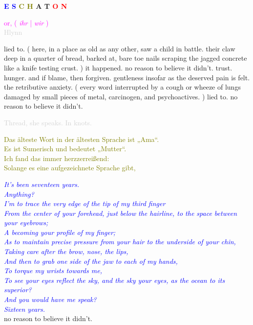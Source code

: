 \documentclass[11pt]{article}
\begin{document}
\begingroup
\begin{center}
\huge \textbf{\textcolor{blue}{E S} \textcolor{olive}{C H} A T \textcolor{red}{O N}}
\end{center}
\endgroup

\begingroup
\begin{center}
\textcolor{magenta}{or, ( \textit{ihr} | \textit{wir} )} \\ \textcolor{lightgray}{Hlynn}
\end{center}
\endgroup

\vspace*{2\baselineskip}

\begingroup
lied to. ( here, in a place as old as any other, saw a child in battle. their claw deep in a quarter of bread, barked at, bare toe nails scraping the jagged concrete like a knife testing crust. ) it happened. no reason to believe it didn't. trust. hunger. and if blame, then forgiven. gentleness insofar as the deserved pain is felt. the retributive anxiety. ( every word interrupted by a cough or wheeze of lungs damaged by small pieces of metal, carcinogen, and psychoactives. ) lied to. no reason to believe it didn't.
\endgroup

\begingroup
\begin{center}
\textcolor{lightgray}{Thread, she speaks. In knots.}
\rightskip\leftskip
\end{center}
\endgroup

\begingroup
\begin{center}
\textcolor{olive}{Das älteste Wort in der ältesten Sprache ist „Ama“. \\ Es ist Sumerisch und bedeutet „Mutter“. \\ Ich fand das immer herzzerreißend: \\ Solange es eine aufgezeichnete Sprache gibt,}
\end{center}
\endgroup

\begingroup
\begin{center}
\textit{\textcolor{blue}{It's been seventeen years. \\ Anything? \\ I'm to trace the very edge of the tip of my third finger \\ From the center of your forehead, just below the hairline, to the space between your eyebrows; \\ A becoming your profile of my finger; \\ As to maintain precise pressure from your hair to the underside of your chin, \\ Taking care after the brow, nose, the lips, \\ And then to grab one side of the jaw to each of my hands, \\ To torque my wrists towards me, \\ To see your eyes reflect the sky, and the sky your eyes, as the ocean to its superior? \\ And you would have me speak? \\ Sixteen years. } } \\ no reason to believe it didn't. 
\end{center}
\endgroup
\end{document}

